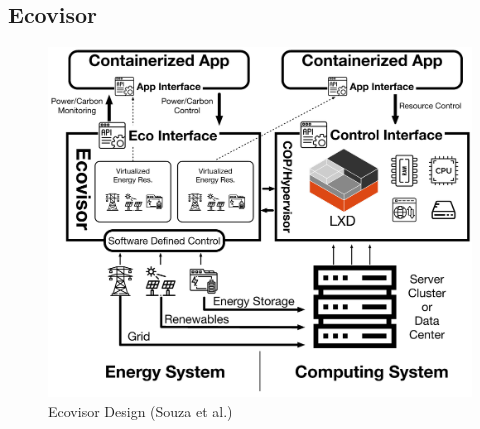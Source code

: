 \subsection{Ecovisor}

\begin{figure}
    \centering
    \includegraphics[width=\linewidth]{figures/ecovisor_design}
    \caption{Ecovisor Design (Souza et al.) \cite{souza2023}}
    \label{fig:ecovisor_design}
\end{figure}

